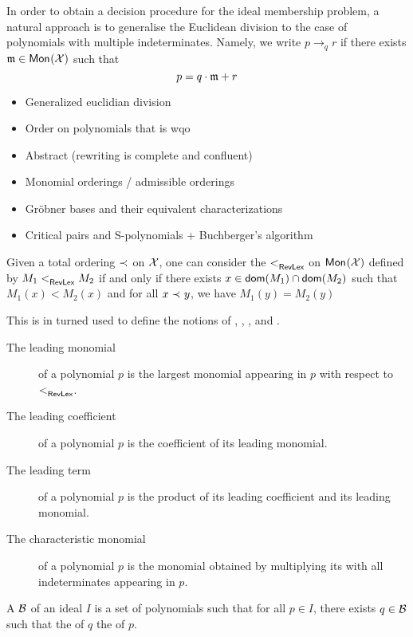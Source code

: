 In order to obtain a decision procedure for the ideal membership problem, a natural approach
is to generalise the Euclidean division to the case of polynomials with multiple
indeterminates. Namely, 
we write $p \to_{q} r$ if there exists $\monelt \in \mon{\X}$ such that
\begin{equation}
    \label{eq:euclidian}
    p = q \cdot \monelt + r
  \end{equation}

\begin{itemize}
  \item Generalized euclidian division
  \item Order on polynomials that is wqo
  \item Abstract  (rewriting is complete and confluent)
  \item Monomial orderings / admissible orderings
  \item Gröbner bases and their equivalent characterizations
  \item Critical pairs and S-polynomials + Buchberger's algorithm
\end{itemize}

Given a total ordering $\prec_{}$ on $\mathcal{X}$, one can
consider the  $<_{\mathsf{RevLex}}^{}$ on $\mathsf{Mon}_{}(\mathcal{X})$ defined by $M_1
<_{\mathsf{RevLex}}^{} M_2$ if and only if there exists $x \in \mathsf{dom}(M_1) \cap \mathsf{dom}(M_2)$ such
that $M_1(x) < M_2(x)$ and for all $x \prec_{} y$, we have $M_1(y) = M_2(y)$

This is in turned used to define the notions of ,
, , and .
\begin{description}
    \item[The leading monomial] of a polynomial $p$ is the largest monomial
        appearing in $p$ with respect to $<_{\mathsf{RevLex}}^{}$.
    \item[The leading coefficient] of a polynomial $p$ is the coefficient of
        its leading monomial.
    \item[The leading term] of a polynomial $p$ is the product of its leading
        coefficient and its leading monomial.
    \item[The characteristic monomial] of a polynomial $p$ is the monomial
        obtained by multiplying its  with all indeterminates
        appearing in $p$.
\end{description}

A  $\Basis$ of an ideal $I$ is a set of polynomials such
that for all $p \in I$, there exists $q \in \Basis$ such that the  of $q$  the  of $p$.
